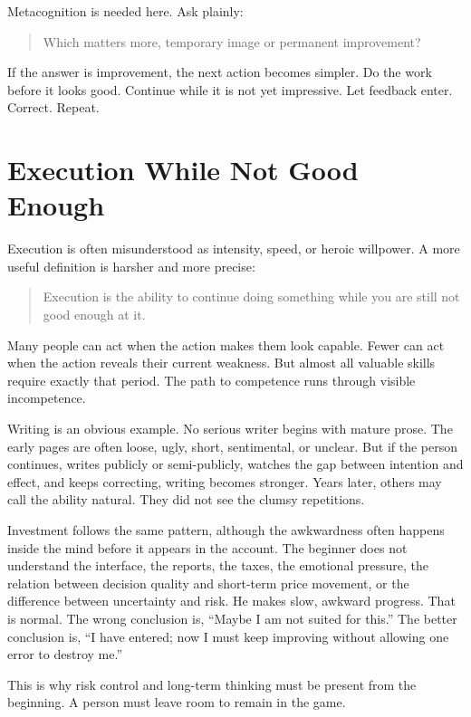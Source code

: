 Metacognition is needed here. Ask plainly:

\begin{quote}
Which matters more, temporary image or permanent improvement?
\end{quote}

If the answer is improvement, the next action becomes simpler. Do the work before it looks good. Continue while it is not yet impressive. Let feedback enter. Correct. Repeat.

\section*{Execution While Not Good Enough}

Execution is often misunderstood as intensity, speed, or heroic willpower. A more useful definition is harsher and more precise:

\begin{quote}
Execution is the ability to continue doing something while you are still not good enough at it.
\end{quote}

Many people can act when the action makes them look capable. Fewer can act when the action reveals their current weakness. But almost all valuable skills require exactly that period. The path to competence runs through visible incompetence.

Writing is an obvious example. No serious writer begins with mature prose. The early pages are often loose, ugly, short, sentimental, or unclear. But if the person continues, writes publicly or semi-publicly, watches the gap between intention and effect, and keeps correcting, writing becomes stronger. Years later, others may call the ability natural. They did not see the clumsy repetitions.

Investment follows the same pattern, although the awkwardness often happens inside the mind before it appears in the account. The beginner does not understand the interface, the reports, the taxes, the emotional pressure, the relation between decision quality and short-term price movement, or the difference between uncertainty and risk. He makes slow, awkward progress. That is normal. The wrong conclusion is, ``Maybe I am not suited for this.'' The better conclusion is, ``I have entered; now I must keep improving without allowing one error to destroy me.''

This is why risk control and long-term thinking must be present from the beginning. A person must leave room to remain in the game.

